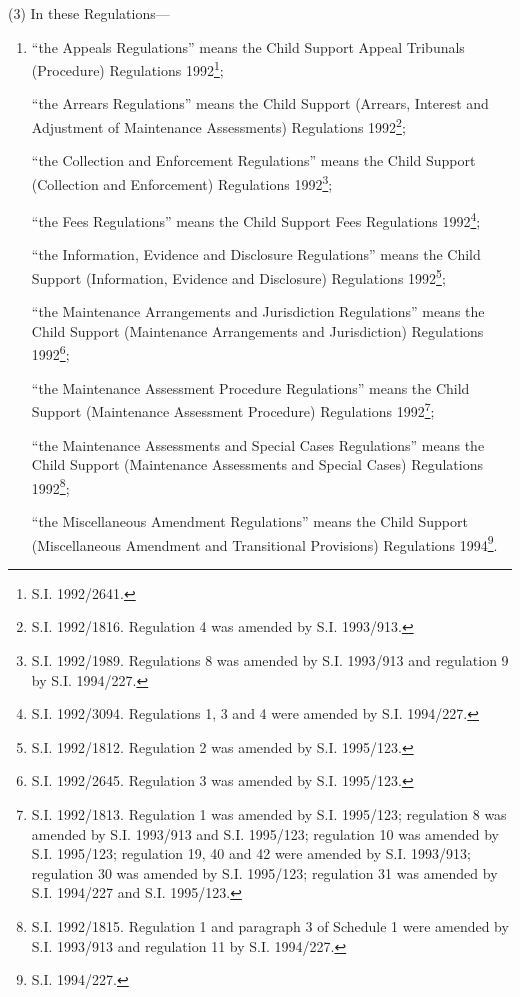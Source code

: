 \documentclass[12pt,a4paper]{article}
\begin{document}
(3) In these Regulations—
\begin{enumerate}\item[]
“the Appeals Regulations” means the Child Support Appeal Tribunals (Procedure) Regulations 1992\footnote{\frenchspacing S.I. 1992/2641.};

“the Arrears Regulations” means the Child Support (Arrears, Interest and Adjustment of Maintenance Assessments) Regulations 1992\footnote{\frenchspacing S.I. 1992/1816. Regulation 4 was amended by S.I. 1993/913.};

“the Collection and Enforcement Regulations” means the Child Support (Collection and Enforcement) Regulations 1992\footnote{\frenchspacing S.I. 1992/1989. Regulations 8 was amended by S.I. 1993/913 and regulation 9 by S.I. 1994/227.};

“the Fees Regulations” means the Child Support Fees Regulations 1992\footnote{\frenchspacing S.I. 1992/3094. Regulations 1, 3 and 4 were amended by S.I. 1994/227.};

“the Information, Evidence and Disclosure Regulations” means the Child Support (Information, Evidence and Disclosure) Regulations 1992\footnote{\frenchspacing S.I. 1992/1812. Regulation 2 was amended by S.I. 1995/123.};

“the Maintenance Arrangements and Jurisdiction Regulations” means the Child Support (Maintenance Arrangements and Jurisdiction) Regulations 1992\footnote{\frenchspacing S.I. 1992/2645. Regulation 3 was amended by S.I. 1995/123.};

“the Maintenance Assessment Procedure Regulations” means the Child Support (Maintenance Assessment Procedure) Regulations 1992\footnote{\frenchspacing S.I. 1992/1813. Regulation 1 was amended by S.I. 1995/123; regulation 8 was amended by S.I. 1993/913 and S.I. 1995/123; regulation 10 was amended by S.I. 1995/123; regulation 19, 40 and 42 were amended by S.I. 1993/913; regulation 30 was amended by S.I. 1995/123; regulation 31 was amended by S.I. 1994/227 and S.I. 1995/123.};

“the Maintenance Assessments and Special Cases Regulations” means the Child Support (Maintenance Assessments and Special Cases) Regulations 1992\footnote{\frenchspacing S.I. 1992/1815. Regulation 1 and paragraph 3 of Schedule 1 were amended by S.I. 1993/913 and regulation 11 by S.I. 1994/227.};

“the Miscellaneous Amendment Regulations” means the Child Support (Miscellaneous Amendment 
and Transitional Provisions) Regulations 1994\footnote{\frenchspacing S.I. 1994/227.}.
\end{enumerate}
\end{document}
